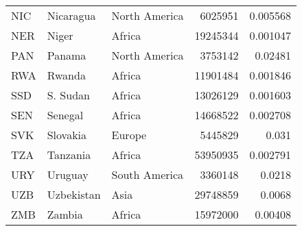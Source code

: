 \begin{table}[h!]
\begin{tabular}{lllrr}
      NIC     & Nicaragua       & North America & 6025951  & 0.005568      \\
      NER     & Niger           & Africa        & 19245344 & 0.001047      \\
      PAN     & Panama          & North America & 3753142  & 0.02481       \\
      RWA     & Rwanda          & Africa        & 11901484 & 0.001846      \\
      SSD     & S. Sudan        & Africa        & 13026129 & 0.001603      \\
      SEN     & Senegal         & Africa        & 14668522 & 0.002708      \\
      SVK     & Slovakia        & Europe        & 5445829  & 0.031         \\
      TZA     & Tanzania        & Africa        & 53950935 & 0.002791      \\
      URY     & Uruguay         & South America & 3360148  & 0.0218        \\
      UZB     & Uzbekistan      & Asia          & 29748859 & 0.0068        \\
      ZMB     & Zambia          & Africa        & 15972000 & 0.00408       \\
      \bottomrule
   \end{tabular}
\end{table}
